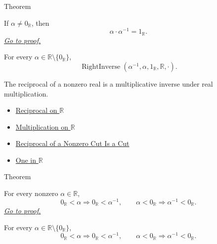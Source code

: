 \begin{theorembox}{Theorem}
\begin{theorem}
\label{thm:reciprocal-multiplicative-inverse-on-r}
If $\alpha\ne0_{\mathbb{R}}$, then
\[
\alpha\cdot\alpha^{-1}=1_{\mathbb{R}}.
\]
\hyperref[prf:reciprocal-multiplicative-inverse-on-r]{\textit{Go to proof.}}
\end{theorem}
\end{theorembox}

\begin{remark*}
For every $\alpha\in\mathbb{R}\setminus\{0_{\mathbb{R}}\}$,
\[
\operatorname{RightInverse}(\alpha^{-1},\alpha,1_{\mathbb{R}},\mathbb{R},\cdot).
\]
\end{remark*}

\begin{remark*}[Interpretation]
The reciprocal of a nonzero real is a multiplicative inverse under real
multiplication.
\end{remark*}

\begin{dependencies}
\begin{itemize}
  \item \hyperref[def:reciprocal-on-r]{Reciprocal on $\mathbb{R}$}
  \item \hyperref[def:multiplication-on-r]{Multiplication on $\mathbb{R}$}
  \item \hyperref[lem:reciprocal-is-a-cut]{Reciprocal of a Nonzero Cut Is a Cut}
  \item \hyperref[def:one-in-r]{One in $\mathbb{R}$}
\end{itemize}
\end{dependencies}

\begin{theorembox}{Theorem}
\begin{theorem}
\label{thm:sign-of-reciprocal-r}
For every nonzero $\alpha\in\mathbb{R}$,
\[
0_{\mathbb{R}}<\alpha \Longrightarrow 0_{\mathbb{R}}<\alpha^{-1},
\qquad
\alpha<0_{\mathbb{R}} \Longrightarrow \alpha^{-1}<0_{\mathbb{R}}.
\]
\hyperref[prf:sign-of-reciprocal-r]{\textit{Go to proof.}}
\end{theorem}
\end{theorembox}

\begin{remark*}
For every $\alpha\in\mathbb{R}\setminus\{0_{\mathbb{R}}\}$,
\[
0_{\mathbb{R}}<\alpha \Longrightarrow 0_{\mathbb{R}}<\alpha^{-1},
\qquad
\alpha<0_{\mathbb{R}} \Longrightarrow \alpha^{-1}<0_{\mathbb{R}}.
\]
\end{remark*}

